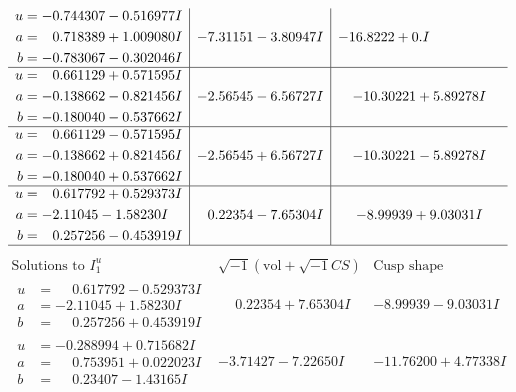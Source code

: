 \documentclass[1p]{elsarticle_modified}
\theoremstyle{definition}
\newcommand{\I}{\sqrt{-1}}
\begin{document}
$$\begin{array}{c|c|c}
\begin{aligned}
u &= -0.744307 - 0.516977 I \\
a &= \phantom{-}0.718389 + 1.009080 I \\
b &= -0.783067 - 0.302046 I\end{aligned}
 & -7.31151 - 3.80947 I & -16.8222 + 0. I\phantom{ +0.000000I} \\ \hline\begin{aligned}
u &= \phantom{-}0.661129 + 0.571595 I \\
a &= -0.138662 - 0.821456 I \\
b &= -0.180040 - 0.537662 I\end{aligned}
 & -2.56545 - 6.56727 I & -10.30221 + 5.89278 I \\ \hline\begin{aligned}
u &= \phantom{-}0.661129 - 0.571595 I \\
a &= -0.138662 + 0.821456 I \\
b &= -0.180040 + 0.537662 I\end{aligned}
 & -2.56545 + 6.56727 I & -10.30221 - 5.89278 I \\ \hline\begin{aligned}
u &= \phantom{-}0.617792 + 0.529373 I \\
a &= -2.11045 - 1.58230 I \\
b &= \phantom{-}0.257256 - 0.453919 I\end{aligned}
 & \phantom{-}0.22354 - 7.65304 I & -8.99939 + 9.03031 I\\
 \hline 
 \end{array}$$\newpage$$\begin{array}{c|c|c}  
\text{Solutions to }I^u_{1}& \I (\text{vol} + \sqrt{-1}CS) & \text{Cusp shape}\\
 \hline 
\begin{aligned}
u &= \phantom{-}0.617792 - 0.529373 I \\
a &= -2.11045 + 1.58230 I \\
b &= \phantom{-}0.257256 + 0.453919 I\end{aligned}
 & \phantom{-}0.22354 + 7.65304 I & -8.99939 - 9.03031 I \\ \hline\begin{aligned}
u &= -0.288994 + 0.715682 I \\
a &= \phantom{-}0.753951 + 0.022023 I \\
b &= \phantom{-}0.23407 - 1.43165 I\end{aligned}
 & -3.71427 - 7.22650 I & -11.76200 + 4.77338 I \\ \hline\begin{aligned}

\end{aligned}
\end{array}$$
\end{document}
